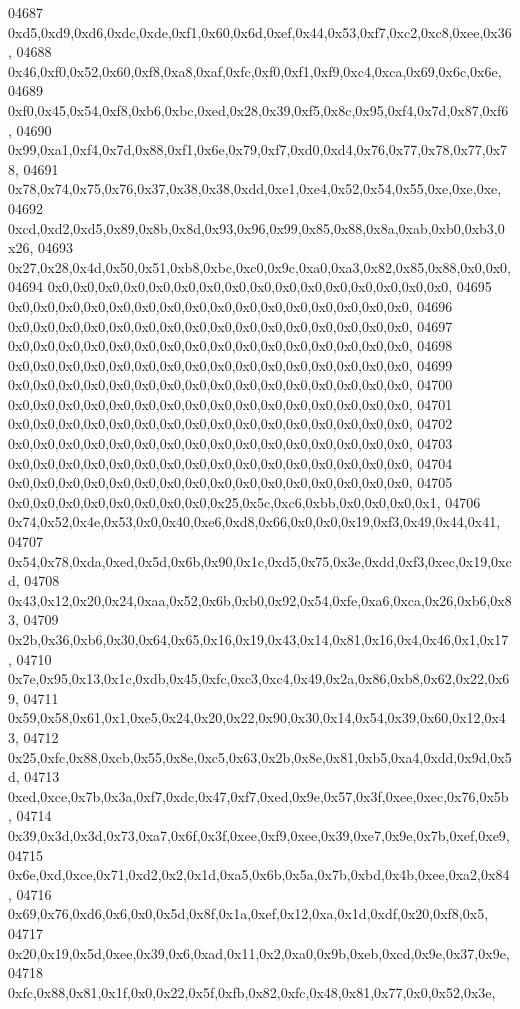 \begin{DoxyCode}
04687   0xd5,0xd9,0xd6,0xdc,0xde,0xf1,0x60,0x6d,0xef,0x44,0x53,0xf7,0xc2,0xc8,0xee,0x36,
04688   0x46,0xf0,0x52,0x60,0xf8,0xa8,0xaf,0xfc,0xf0,0xf1,0xf9,0xc4,0xca,0x69,0x6c,0x6e,
04689   0xf0,0x45,0x54,0xf8,0xb6,0xbc,0xed,0x28,0x39,0xf5,0x8c,0x95,0xf4,0x7d,0x87,0xf6,
04690   0x99,0xa1,0xf4,0x7d,0x88,0xf1,0x6e,0x79,0xf7,0xd0,0xd4,0x76,0x77,0x78,0x77,0x78,
04691   0x78,0x74,0x75,0x76,0x37,0x38,0x38,0xdd,0xe1,0xe4,0x52,0x54,0x55,0xe,0xe,0xe,
04692   0xcd,0xd2,0xd5,0x89,0x8b,0x8d,0x93,0x96,0x99,0x85,0x88,0x8a,0xab,0xb0,0xb3,0x26,
04693   0x27,0x28,0x4d,0x50,0x51,0xb8,0xbc,0xc0,0x9c,0xa0,0xa3,0x82,0x85,0x88,0x0,0x0,
04694   0x0,0x0,0x0,0x0,0x0,0x0,0x0,0x0,0x0,0x0,0x0,0x0,0x0,0x0,0x0,0x0,
04695   0x0,0x0,0x0,0x0,0x0,0x0,0x0,0x0,0x0,0x0,0x0,0x0,0x0,0x0,0x0,0x0,
04696   0x0,0x0,0x0,0x0,0x0,0x0,0x0,0x0,0x0,0x0,0x0,0x0,0x0,0x0,0x0,0x0,
04697   0x0,0x0,0x0,0x0,0x0,0x0,0x0,0x0,0x0,0x0,0x0,0x0,0x0,0x0,0x0,0x0,
04698   0x0,0x0,0x0,0x0,0x0,0x0,0x0,0x0,0x0,0x0,0x0,0x0,0x0,0x0,0x0,0x0,
04699   0x0,0x0,0x0,0x0,0x0,0x0,0x0,0x0,0x0,0x0,0x0,0x0,0x0,0x0,0x0,0x0,
04700   0x0,0x0,0x0,0x0,0x0,0x0,0x0,0x0,0x0,0x0,0x0,0x0,0x0,0x0,0x0,0x0,
04701   0x0,0x0,0x0,0x0,0x0,0x0,0x0,0x0,0x0,0x0,0x0,0x0,0x0,0x0,0x0,0x0,
04702   0x0,0x0,0x0,0x0,0x0,0x0,0x0,0x0,0x0,0x0,0x0,0x0,0x0,0x0,0x0,0x0,
04703   0x0,0x0,0x0,0x0,0x0,0x0,0x0,0x0,0x0,0x0,0x0,0x0,0x0,0x0,0x0,0x0,
04704   0x0,0x0,0x0,0x0,0x0,0x0,0x0,0x0,0x0,0x0,0x0,0x0,0x0,0x0,0x0,0x0,
04705   0x0,0x0,0x0,0x0,0x0,0x0,0x0,0x0,0x25,0x5c,0xc6,0xbb,0x0,0x0,0x0,0x1,
04706   0x74,0x52,0x4e,0x53,0x0,0x40,0xe6,0xd8,0x66,0x0,0x0,0x19,0xf3,0x49,0x44,0x41,
04707   0x54,0x78,0xda,0xed,0x5d,0x6b,0x90,0x1c,0xd5,0x75,0x3e,0xdd,0xf3,0xec,0x19,0xcd,
04708   0x43,0x12,0x20,0x24,0xaa,0x52,0x6b,0xb0,0x92,0x54,0xfe,0xa6,0xca,0x26,0xb6,0x83,
04709   0x2b,0x36,0xb6,0x30,0x64,0x65,0x16,0x19,0x43,0x14,0x81,0x16,0x4,0x46,0x1,0x17,
04710   0x7e,0x95,0x13,0x1c,0xdb,0x45,0xfc,0xc3,0xc4,0x49,0x2a,0x86,0xb8,0x62,0x22,0x69,
04711   0x59,0x58,0x61,0x1,0xe5,0x24,0x20,0x22,0x90,0x30,0x14,0x54,0x39,0x60,0x12,0x43,
04712   0x25,0xfc,0x88,0xcb,0x55,0x8e,0xc5,0x63,0x2b,0x8e,0x81,0xb5,0xa4,0xdd,0x9d,0x5d,
04713   0xed,0xce,0x7b,0x3a,0xf7,0xdc,0x47,0xf7,0xed,0x9e,0x57,0x3f,0xee,0xec,0x76,0x5b,
04714   0x39,0x3d,0x3d,0x73,0xa7,0x6f,0x3f,0xee,0xf9,0xee,0x39,0xe7,0x9e,0x7b,0xef,0xe9,
04715   0x6e,0xd,0xce,0x71,0xd2,0x2,0x1d,0xa5,0x6b,0x5a,0x7b,0xbd,0x4b,0xee,0xa2,0x84,
04716   0x69,0x76,0xd6,0x6,0x0,0x5d,0x8f,0x1a,0xef,0x12,0xa,0x1d,0xdf,0x20,0xf8,0x5,
04717   0x20,0x19,0x5d,0xee,0x39,0x6,0xad,0x11,0x2,0xa0,0x9b,0xeb,0xcd,0x9e,0x37,0x9e,
04718   0xfc,0x88,0x81,0x1f,0x0,0x22,0x5f,0xfb,0x82,0xfc,0x48,0x81,0x77,0x0,0x52,0x3e,

\end{DoxyCode}
